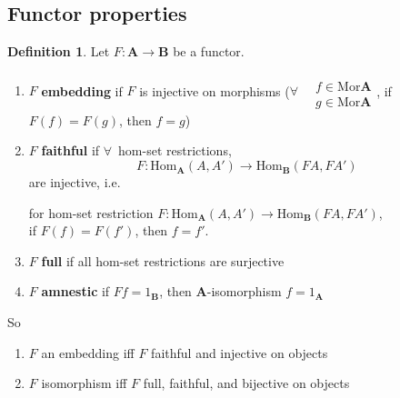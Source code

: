 \documentclass[twoside,landscape,10pt]{amsart}
\theoremstyle{plain}
\theoremstyle{definition}
\newtheorem{definition}{Definition}
\theoremstyle{remark}
\begin{document}
\begin{multicols*}{2}
\begin{itemize}



\end{itemize}

\subsection{Functor properties}

\begin{definition}
  Let $F: \mathbf{A} \to \mathbf{B}$ be a functor.  

\begin{enumerate}
  \item $F$ \textbf{embedding } if $F$ is injective on morphisms ($\forall \, \begin{aligned} & \quad \\
    & f \in \text{Mor}\mathbf{A} \\
    & g \in \text{Mor}\mathbf{A} \end{aligned}$, if $F(f) = F(g)$, then $f=g$) 
\item $F$ \textbf{faithful } if $\forall \,$ hom-set restrictions, 
\[
F: \text{Hom}_{\mathbf{A}}(A,A') \to \text{Hom}_{\mathbf{B}}(FA,FA')
\]
are injective, i.e. 

for hom-set restriction $F: \text{Hom}_{\mathbf{A}}(A,A') \to \text{Hom}_{\mathbf{B}}(FA,FA')$, \\
if $F(f) = F(f')$, then $f=f'$.  

\item $F$ \textbf{full} if all hom-set restrictions are surjective 
\item $F$ \textbf{amnestic} if $Ff=1_{\mathbf{B}}$, then $\mathbf{A}$-isomorphism $f=1_{\mathbf{A}}$
\end{enumerate}
So
\begin{enumerate}
\item $F$ an embedding iff $F$ faithful and injective on objects
\item $F$ isomorphism iff $F$ full, faithful, and bijective on objects
\end{enumerate}


\end{definition}
\end{multicols*}
\end{document}
